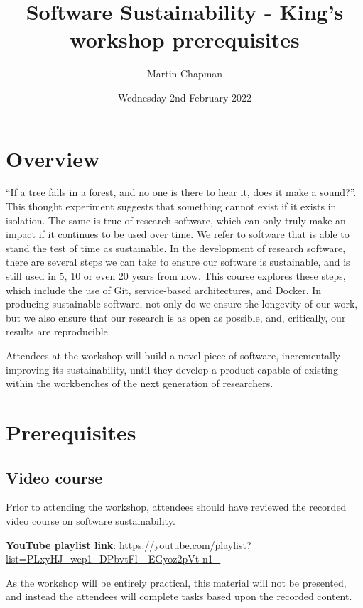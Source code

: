 \documentclass{article}
\title{Software Sustainability - King's workshop prerequisites}
\author{Martin Chapman}
\date{Wednesday 2nd February 2022}
\begin{document}

\maketitle

\section{Overview}

``If a tree falls in a forest, and no one is there to hear it, does it make a sound?''. 
This thought experiment suggests that something cannot exist if it exists in isolation. 
The same is true of research software, which can only truly make an impact if it continues to be used over time. 
We refer to software that is able to stand the test of time as sustainable. 
In the development of research software, there are several steps we can take to ensure our software is sustainable, and is still used in 5, 10 or even 20 years from now. 
This course explores these steps, which include the use of Git, service-based architectures, and Docker. 
In producing sustainable software, not only do we ensure the longevity of our work, but we also ensure that our research is as open as possible, and, critically, our results are reproducible.

Attendees at the workshop will build a novel piece of software, incrementally improving its sustainability, until they develop a product capable of existing within the workbenches of the next generation of researchers.

\section{Prerequisites}

\subsection{Video course}

Prior to attending the workshop, attendees should have reviewed the recorded video course on software sustainability.

\textbf{YouTube playlist link}: \newline
\href{https://youtube.com/playlist?list=PLxyHJ\_wep1\_DPbvtFl\_-EGyoz2pVt-n1\_}{https://youtube.com/playlist?list=PLxyHJ\_wep1\_DPbvtFl\_-EGyoz2pVt-n1\_}

As the workshop will be entirely practical, this material will not be presented, and instead the attendees will complete tasks based upon the recorded content. 
\end{document}
